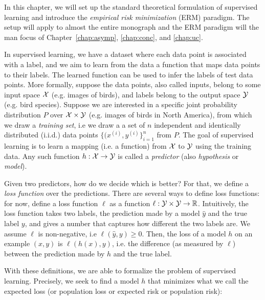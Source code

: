 
\setcounter{section}{0}



In this chapter, we will set up the standard theoretical formulation of supervised learning and introduce the \textit{empirical risk minimization} (ERM) paradigm. The setup will apply to almost the entire monograph and the ERM paradigm will the man focus of Chapter~\ref{chap:asymp}, \ref{chap:conc}, and \ref{chap:uc}. 

\label{lec1:sec:sup-learn}
In supervised learning, we have a dataset where each data point is associated with a label, and we aim to learn from the data a function that maps data points to their labels. The learned  function can be used to infer the labels of test data points. More formally, suppose the data points, also called inputs,  belong to some input space $\mathcal X$ (e.g. images of birds), and labels belong to the output space $\mathcal Y$ (e.g. bird species). Suppose we are interested in a specific joint probability distribution $P$ over $\mathcal X \times \mathcal Y$ (e.g. images of birds in North America), from which we draw a \emph{training set}, i.e we draw a a set of $n$ independent and identically distributed (i.i.d.) data points $\{(x^{(i)}, y^{(i)}\}_{i=1}^n$ from $P$. The goal of supervised learning is to learn a mapping (i.e. a function) from $\mathcal X$ to $\mathcal Y$ using the training data. Any such function $h : \mathcal X \rightarrow \mathcal Y$ is called a \emph{predictor} (also \emph{hypothesis} or \emph{model}).

Given two predictors, how do we decide which is better? For that, we define a \emph{loss function} over the predictions. There are several ways to define loss functions: for now, define a loss function $\ell$ as a function $\ell : \mathcal Y \times \mathcal Y \rightarrow \mathbb R$. Intuitively, the loss function takes two labels, the prediction made by a model $\hat{y}$ and the true label $y$, and gives a number that captures how different the two labels are. We assume $\ell$ is non-negative, i.e $\ell(\hat{y}, y) \geq 0$. Then, the loss of a model $h$ on an example $(x, y)$ is $\ell(h(x), y)$, i.e. the difference (as measured by $\ell$) between the prediction made by $h$ and the true label.


With these definitions, we are able to formalize the problem of supervised learning. Precisely, we seek to find a model $h$ that minimizes what we call the expected loss (or population loss or expected risk or population risk):


